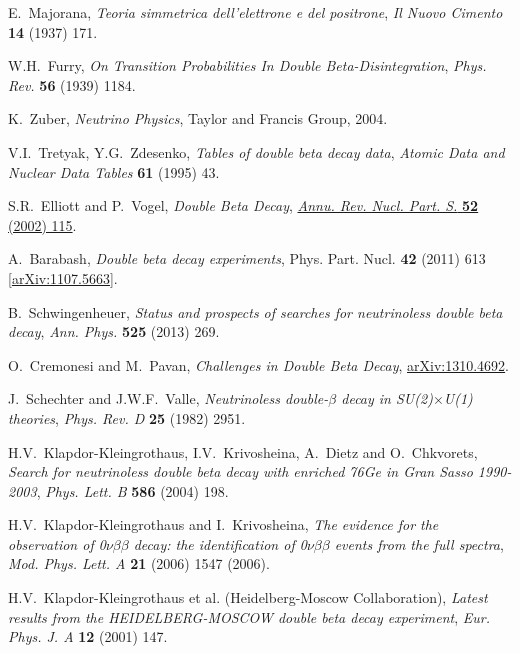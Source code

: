 \documentclass{JINST}
\begin{document}
\begin{thebibliography}{35}
E.~Majorana, \emph{Teoria simmetrica dell'elettrone e del positrone}, \emph{Il Nuovo Cimento} {\bf 14} (1937) 171. 

W.H.~Furry, \emph{On Transition Probabilities In Double Beta-Disintegration}, \emph{Phys. Rev.} {\bf 56} (1939) 1184. 

K.~Zuber, \emph{Neutrino Physics}, Taylor and Francis Group, 2004.

V.I.~Tretyak, Y.G.~Zdesenko, \emph{Tables of double beta decay data}, \emph{Atomic Data and Nuclear Data Tables} {\bf 61} (1995) 43. 

S.R.~Elliott and P.~Vogel, \emph{Double Beta Decay}, \href{http://www.annualreviews.org/doi/abs/10.1146/annurev.nucl.52.050102.090641}{\emph{Annu. Rev. Nucl. Part. S.} {\bf 52} (2002) 115}.

A.~Barabash, \emph{Double beta decay experiments}, Phys. Part. Nucl. {\bf 42} (2011) 613 [\href{http://arxiv.org/abs/1107.5663}{arXiv:1107.5663}].

B.~Schwingenheuer, \emph{Status and prospects of searches for neutrinoless double beta decay}, \emph{Ann. Phys.} {\bf 525} (2013) 269.

O.~Cremonesi and M.~Pavan, \emph{Challenges in Double Beta Decay}, \href{http://arxiv.org/abs/1310.4692}{arXiv:1310.4692}.

J.~Schechter and J.W.F.~Valle, \emph{Neutrinoless double-$\beta$ decay in SU(2)$\times$U(1) theories}, \emph{Phys. Rev. D} {\bf 25} (1982) 2951.  

H.V.~Klapdor-Kleingrothaus, I.V.~Krivosheina, A.~Dietz and O.~Chkvorets, \emph{Search for neutrinoless double beta decay with enriched 76Ge in Gran Sasso 1990-2003}, \emph{Phys. Lett. B} {\bf 586} (2004) 198.

H.V.~Klapdor-Kleingrothaus and I.~Krivosheina, \emph{The evidence for the observation of 0$\nu\beta\beta$ decay: the identification of 0$\nu\beta\beta$ events from the full spectra}, \emph{Mod. Phys. Lett. A} {\bf 21} (2006) 1547 (2006).

H.V.~Klapdor-Kleingrothaus et al. (Heidelberg-Moscow Collaboration), \emph{Latest results from the HEIDELBERG-MOSCOW double beta decay experiment}, \emph{Eur. Phys. J. A} {\bf 12} (2001) 147.


\end{thebibliography}
\end{document}
